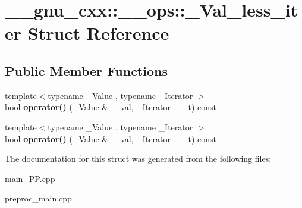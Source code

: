 \hypertarget{struct____gnu__cxx_1_1____ops_1_1__Val__less__iter}{\section{\+\_\+\+\_\+gnu\+\_\+cxx\+:\+:\+\_\+\+\_\+ops\+:\+:\+\_\+\+Val\+\_\+less\+\_\+iter Struct Reference}
\label{struct____gnu__cxx_1_1____ops_1_1__Val__less__iter}
}
\subsection*{Public Member Functions}
\begin{DoxyCompactItemize}
\item 
\hypertarget{struct____gnu__cxx_1_1____ops_1_1__Val__less__iter_ad6286a7fd782cb5f8f49ab53094d6b25}{{\footnotesize template$<$typename \+\_\+\+Value , typename \+\_\+\+Iterator $>$ }\\bool {\bfseries operator()} (\+\_\+\+Value \&\+\_\+\+\_\+val, \+\_\+\+Iterator \+\_\+\+\_\+it) const }\label{struct____gnu__cxx_1_1____ops_1_1__Val__less__iter_ad6286a7fd782cb5f8f49ab53094d6b25}

\item 
\hypertarget{struct____gnu__cxx_1_1____ops_1_1__Val__less__iter_ad6286a7fd782cb5f8f49ab53094d6b25}{{\footnotesize template$<$typename \+\_\+\+Value , typename \+\_\+\+Iterator $>$ }\\bool {\bfseries operator()} (\+\_\+\+Value \&\+\_\+\+\_\+val, \+\_\+\+Iterator \+\_\+\+\_\+it) const }\label{struct____gnu__cxx_1_1____ops_1_1__Val__less__iter_ad6286a7fd782cb5f8f49ab53094d6b25}

\end{DoxyCompactItemize}


The documentation for this struct was generated from the following files\+:\begin{DoxyCompactItemize}
\item 
main\+\_\+\+P\+P.\+cpp\item 
preproc\+\_\+main.\+cpp\end{DoxyCompactItemize}
